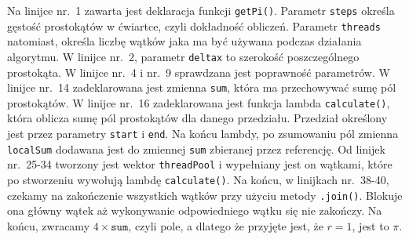 Na linijce nr.~1 zawarta jest deklaracja funkcji \texttt{getPi()}. Parametr \texttt{steps} określa gęstość prostokątów w ćwiartce, czyli dokładność obliczeń. Parametr \texttt{threads} natomiast, określa liczbę wątków jaka ma być używana podczas działania algorytmu. W linijce nr.~2, parametr \texttt{deltax} to szerokość poszczególnego prostokąta. W linijce nr.~4 i nr.~9 sprawdzana jest poprawność parametrów. W linijce nr.~14 zadeklarowana jest zmienna \texttt{sum}, która ma przechowywać sumę pól prostokątów. W linijce nr.~16 zadeklarowana jest funkcja lambda \texttt{calculate()}, która oblicza sumę pól prostokątów dla danego przedziału. Przedział określony jest przez parametry \texttt{start} i \texttt{end}. Na końcu lambdy, po zsumowaniu pól zmienna \texttt{localSum} dodawana jest do zmiennej \texttt{sum} zbieranej przez referencję. Od linijek nr.~25-34 tworzony jest wektor \texttt{threadPool} i wypełniany jest on wątkami, które po stworzeniu wywołują lambdę \texttt{calculate()}. Na końcu, w linijkach nr.~38-40, czekamy na zakończenie wszystkich wątków przy użyciu metody \texttt{.join()}. Blokuje ona główny wątek aż wykonywanie odpowiedniego wątku się nie zakończy. Na końcu, zwracamy $4 \times \texttt{sum}$, czyli pole, a dlatego że przyjęte jest, że $r = 1$, jest to $\pi$.
